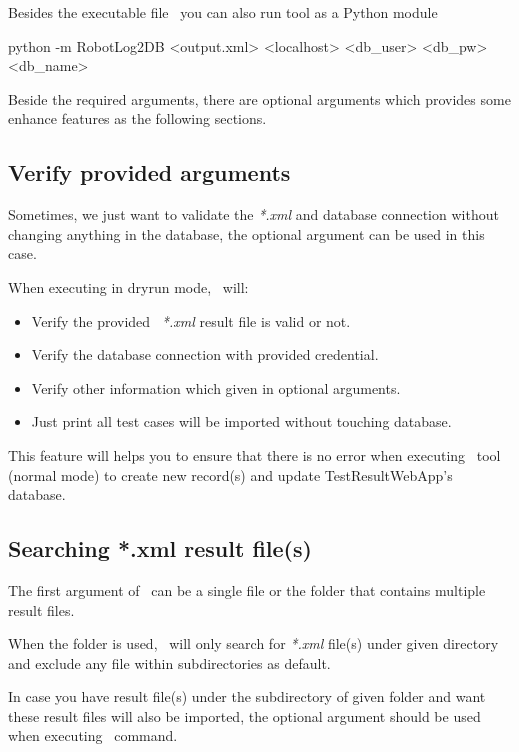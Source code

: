     Besides the executable file \pkg\, you can also run tool as a Python module
\begin{robotlog}
python -m RobotLog2DB <output.xml> <localhost> <db\_user> <db\_pw> <db\_name>
\end{robotlog}

    Beside the required arguments, there are optional arguments which provides 
    some enhance features as the following sections.

  \subsection{Verify provided arguments}
    Sometimes, we just want to validate the \emph{*.xml} and database connection 
    without changing anything in the database, the optional argument 
     can be used in this case.
    
    When executing in dryrun mode, \pkg\ will:
    
    \begin{itemize}
    \tightlist
    \item
      Verify the provided \rfwcore\ \emph{*.xml} result file is valid or not.
    \item
      Verify the database connection with provided credential.
    \item
      Verify other information which given in optional arguments.
    \item
      Just print all test cases will be imported without touching database.
    \end{itemize}
    
    This feature will helps you to ensure that there is no error when
    executing \pkg\ tool (normal mode) to create new record(s) and
    update TestResultWebApp's database.

  \subsection{Searching *.xml result file(s)}
    The first argument  of \pkg\ can be a single file or the 
    folder that contains multiple result files.
    
    When the folder is used, \pkg\ will only search for \emph{*.xml} file(s) 
    under given directory and exclude any file within subdirectories as default.
    
    In case you have result file(s) under the subdirectory of given folder and 
    want these result files will also be imported, the optional argument
     should be used when executing \pkg\ command.
    
